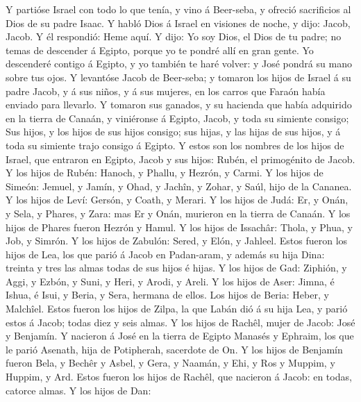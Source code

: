  Y partióse Israel con todo lo que tenía, y vino á
Beer-seba, y ofreció sacrificios al Dios de su padre Isaac.
 Y habló Dios á Israel en visiones de noche, y dijo:
Jacob, Jacob. Y él respondió: Heme aquí.  Y dijo: Yo soy
Dios, el Dios de tu padre; no temas de descender á Egipto, porque yo te
pondré allí en gran gente.  Yo descenderé contigo á
Egipto, y yo también te haré volver: y José pondrá su mano sobre tus
ojos.  Y levantóse Jacob de Beer-seba; y tomaron los hijos
de Israel á su padre Jacob, y á sus niños, y á sus mujeres, en los
carros que Faraón había enviado para llevarlo.  Y tomaron
sus ganados, y su hacienda que había adquirido en la tierra de Canaán, y
viniéronse á Egipto, Jacob, y toda su simiente consigo; 
Sus hijos, y los hijos de sus hijos consigo; sus hijas, y las hijas de
sus hijos, y á toda su simiente trajo consigo á Egipto.  Y
estos son los nombres de los hijos de Israel, que entraron en Egipto,
Jacob y sus hijos: Rubén, el primogénito de Jacob.  Y los
hijos de Rubén: Hanoch, y Phallu, y Hezrón, y Carmi.  Y
los hijos de Simeón: Jemuel, y Jamín, y Ohad, y Jachîn, y Zohar, y Saúl,
hijo de la Cananea.  Y los hijos de Leví: Gersón, y
Coath, y Merari.  Y los hijos de Judá: Er, y Onán, y
Sela, y Phares, y Zara: mas Er y Onán, murieron en la tierra de Canaán.
Y los hijos de Phares fueron Hezrón y Hamul.  Y los hijos
de Issachâr: Thola, y Phua, y Job, y Simrón.  Y los hijos
de Zabulón: Sered, y Elón, y Jahleel.  Estos fueron los
hijos de Lea, los que parió á Jacob en Padan-aram, y además su hija
Dina: treinta y tres las almas todas de sus hijos é hijas.
 Y los hijos de Gad: Ziphión, y Aggi, y Ezbón, y Suni, y
Heri, y Arodi, y Areli.  Y los hijos de Aser: Jimna, é
Ishua, é Isui, y Beria, y Sera, hermana de ellos. Los hijos de Beria:
Heber, y Malchîel.  Estos fueron los hijos de Zilpa, la
que Labán dió á su hija Lea, y parió estos á Jacob; todas diez y seis
almas.  Y los hijos de Rachêl, mujer de Jacob: José y
Benjamín.  Y nacieron á José en la tierra de Egipto
Manasés y Ephraim, los que le parió Asenath, hija de Potipherah,
sacerdote de On.  Y los hijos de Benjamín fueron Bela, y
Bechêr y Asbel, y Gera, y Naamán, y Ehi, y Ros y Muppim, y Huppim, y
Ard.  Estos fueron los hijos de Rachêl, que nacieron á
Jacob: en todas, catorce almas.  Y los hijos de Dan:
